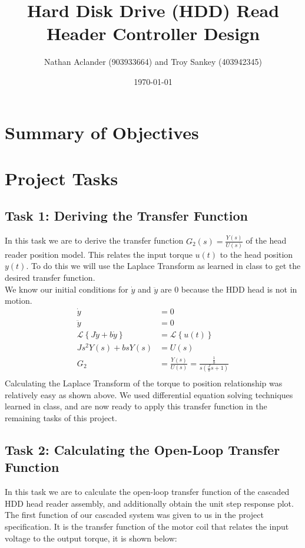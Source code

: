\documentclass{article}
\title{Hard Disk Drive (HDD) Read Header Controller Design}
\date{\today}
\author{Nathan Aclander (903933664) and Troy Sankey (403942345)}
\begin{document}
\maketitle
\newpage

\section*{Summary of Objectives}

\section*{Project Tasks}
\subsection*{Task 1: Deriving the Transfer Function} In this task we are to derive the transfer function $G_2(s) =
	\frac{Y(s)}{U(s)}$ of the head reader position model. This relates the
	input torque $u(t)$ to the head position $y(t)$. To do this we will use
	the Laplace Transform as learned in class to get the desired transfer 
	function. \\
	We know our initial conditions for $\dot{y}$ and $\ddot{y}$ are $0$ because
	the HDD head is not in motion.
	\begin{align*}
		\dot{y} &= 0 \\
		\ddot{y} &= 0 \\
		\mathcal{L}\left\{ J\ddot{y} + b \dot{y}\right\} &= \mathcal{L}\left\{
		u(t)\right\} \\
		Js^2 Y(s) + bsY(s) &= U(s) \\
		G_2 &= \frac{Y(s)}{U(s)} = \frac{\frac{1}{b}}{s(\frac{J}{b}s + 1)}  \\
	\end{align*}
	Calculating the Laplace Transform of the torque to position relationship
	was relatively easy as shown above. We used differential equation solving
	techniques learned in class, and are now ready to apply this transfer
	function in the remaining tasks of this project.

\subsection*{Task 2: Calculating the Open-Loop Transfer Function}
	In this task we are to calculate the open-loop transfer function of the 
	cascaded HDD head reader assembly, and additionally obtain the unit step
	response plot. 
	The first function of our cascaded system was given to us in the project
	specification. It is the transfer function of the motor coil that relates
	the input voltage to the output torque, it is shown below: \\
\end{document}
